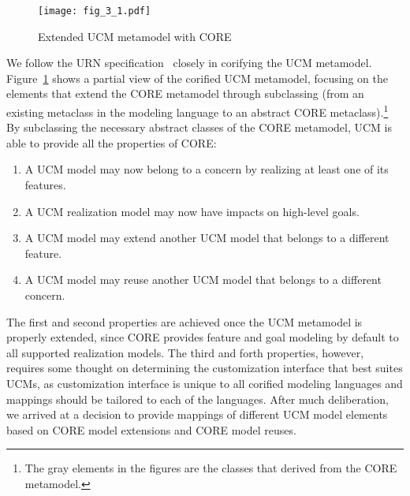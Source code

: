 \begin{figure}
	\centering
	\texttt{[image: fig\_3\_1.pdf]}
	\caption{Extended UCM metamodel with CORE}
	\label{fig:3.1}
\end{figure}

We follow the URN specification~\cite{itu2012151} closely in corifying the UCM metamodel. Figure~\ref{fig:3.1} shows a partial view of the corified UCM metamodel, focusing on the elements that extend the CORE metamodel through subclassing (from an existing metaclass in the modeling language to an abstract CORE metaclass).\footnote{The gray elements in the figures are the classes that derived from the CORE metamodel.} By subclassing the necessary abstract classes of the CORE metamodel, UCM is able to provide all the properties of CORE:

\begin{enumerate}
	\setlength{\parskip}{0pt} \setlength{\itemsep}{0pt}
	\item A UCM model may now belong to a concern by realizing at least one of its features.
	\item A UCM realization model may now have impacts on high-level goals.
	\item A UCM model may extend another UCM model that belongs to a different feature.
	\item A UCM model may reuse another UCM model that belongs to a different concern.
\end{enumerate}

The first and second properties are achieved once the UCM metamodel is properly extended, since CORE provides feature and goal modeling by default to all supported realization models. The third and forth properties, however, requires some thought on determining the customization interface that best suites UCMs, as customization interface is unique to all corified modeling languages and mappings should be tailored to each of the languages. After much deliberation, we arrived at a decision to provide mappings of different UCM model elements based on CORE model extensions and CORE model reuses.

